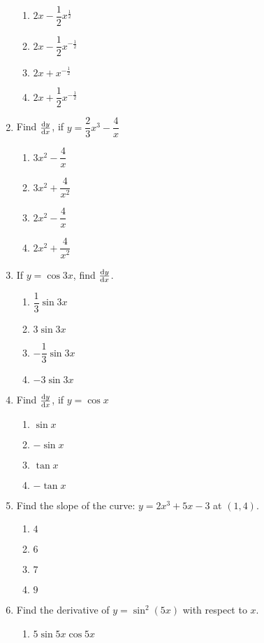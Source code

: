\begin{multicols}{2}
\begin{enumerate}[label={\arabic*.}]
\begin{enumerate}[label={\Alph*.}]
\item \(2x-\dfrac{1}{2}x^{\frac{1}{2}}\)
\item \(2x-\dfrac{1}{2}x^{-{\frac{1}{2}}}\)
\item \(2x+x^{-{\frac{1}{2}}}\)
\item \(2x+\dfrac{1}{2}x^{-{\frac{1}{2}}}\)
\end{enumerate}
\item Find \(\dv{y}{x}\), if \(y = \dfrac{2}{3}{x}^{3}-\dfrac{4}{x}\)
\begin{enumerate}[label={\Alph*.}]
\item \({3}{x}^{2}-\dfrac{4}{x}\)
\item \({3}{x}^{2}+\dfrac{4}{x^{2}}\)
\item \({2}{x}^{2}-\dfrac{4}{x}\)
\item \({2}{x}^{2}+\dfrac{4}{x^{2}}\)
\end{enumerate}
\item If \(y = \cos{3x}\), find \(\dv{y}{x}\).
\begin{enumerate}[label={\Alph*.}]
\item \(\dfrac{1}{3}\sin{3x}\)
\item \({3}\sin{3x}\)
\item \(-{\dfrac{1}{3}}\sin{3x}\)
\item \(-3\sin{3x}\)
\end{enumerate}
\item Find \(\dv{y}{x}\), if \(y = \cos{x}\)
\begin{enumerate}[label={\Alph*.}]
\item \(\sin{x}\)
\item \(-\sin{x}\)
\item \(\tan{x}\)
\item \(-\tan{x}\)
\end{enumerate}
\item Find the slope of the curve: \(y = 2{x}^{3}+ 5{x}-3\) at \((1,4)\).
\begin{enumerate}[label={\Alph*.}]
\item \(4\)
\item \(6\)
\item \(7\)
\item \(9\)
\end{enumerate}
\item Find the derivative of \(y = \sin^{2}{(5x)}\) with respect to \(x\).
\begin{enumerate}[label={\Alph*.}]
\item \(5 \sin{5x\cos{5x}}\)

\end{enumerate}
\end{enumerate}
\end{multicols}
